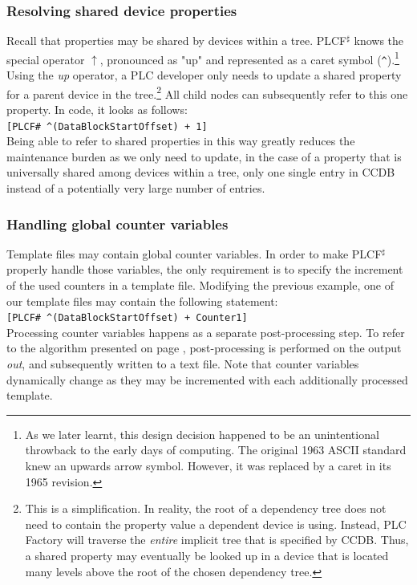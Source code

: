 \documentclass[a4paper,
              ]{jacow}
\begin{document}
\subsubsection{Resolving shared device properties}
Recall that properties may be shared by devices within a tree. PLCF$^\sharp$ knows the special operator $\uparrow$, pronounced as "up" and represented as a caret symbol (\texttt{\textasciicircum}).\footnote{As we later learnt, this design decision happened to be an unintentional throwback to the early days of computing. The original 1963 ASCII standard knew an upwards arrow symbol. However, it was replaced by a caret in its 1965 revision.} Using the \emph{up} operator, a PLC developer only needs to update a shared property for a parent device in the tree.\footnote{This is a simplification. In reality, the root of a dependency tree does not need to contain the property value a dependent device is using. Instead, PLC Factory will traverse the \emph{entire} implicit tree that is specified by CCDB. Thus, a shared property may eventually be looked up in a device that is located many levels above the root of the chosen dependency tree.} All child nodes can subsequently refer to this one property. In code, it looks as follows: \\

\texttt{[PLCF\# \textasciicircum(DataBlockStartOffset) + 1]} \\

Being able to refer to shared properties in this way greatly reduces the maintenance burden as we only need to update, in the case of a property that is universally shared among devices within a tree, only one single entry in CCDB instead of a potentially very large number of entries.


\subsubsection{Handling global counter variables}
Template files may contain global counter variables. In order to make PLCF$^\sharp$ properly handle those variables, the only requirement is to specify the increment of the used counters in a template file. Modifying the previous example, one of our template files may contain the following statement:\\

\texttt{[PLCF\# \textasciicircum(DataBlockStartOffset) + Counter1]} \\

Processing counter variables happens as a separate post-processing step. To refer to the algorithm presented on page \pageref{alg:algo}, post-processing is performed on the output \emph{out}, and subsequently written to a text file. Note that counter variables dynamically change as they may be incremented with each additionally processed template.
\end{document}
